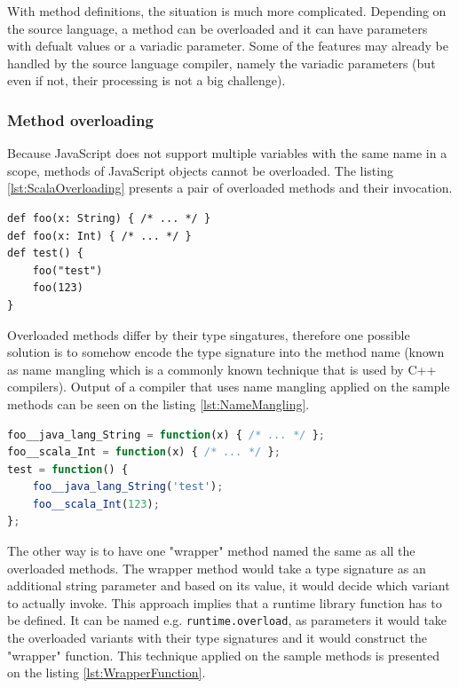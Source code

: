\documentclass[12pt,a4paper]{report}
\begin{document}
With method definitions, the situation is much more complicated. Depending on the source language, a method can be overloaded and it can have parameters with defualt values or a variadic parameter. Some of the features may already be handled by the source language compiler, namely the variadic parameters (but even if not, their processing is not a big challenge).

\subsubsection*{Method overloading}

Because JavaScript does not support multiple variables with the same name in a scope, methods of JavaScript objects cannot be overloaded. The listing \ref{lst:ScalaOverloading} presents a pair of overloaded methods and their invocation.

\begin{lstlisting}[caption={Scala method overloading example.},label={lst:ScalaOverloading}]
def foo(x: String) { /* ... */ }
def foo(x: Int) { /* ... */ }
def test() {
	foo("test")
	foo(123)
}
\end{lstlisting}

Overloaded methods differ by their type singatures, therefore one possible solution is to somehow encode the type signature into the method name (known as name mangling which is a commonly known technique that is used by C++ compilers). Output of a compiler that uses name mangling applied on the sample methods can be seen on the listing \ref{lst:NameMangling}.

\begin{lstlisting}[language=JavaScript,caption={Overloading solved by name mangling.},label={lst:NameMangling}]
foo__java_lang_String = function(x) { /* ... */ };
foo__scala_Int = function(x) { /* ... */ };
test = function() {
	foo__java_lang_String('test');
	foo__scala_Int(123);
};
\end{lstlisting}

The other way is to have one "wrapper" method named the same as all the overloaded methods. The wrapper method would take a type signature as an additional string parameter and based on its value, it would decide which variant to actually invoke. This approach implies that a runtime library function has to be defined. It can be named e.g. \texttt{runtime.overload}, as parameters it would take the overloaded variants with their type signatures and it would construct the "wrapper" function. This technique applied on the sample methods is presented on the listing \ref{lst:WrapperFunction}.
\end{document}
